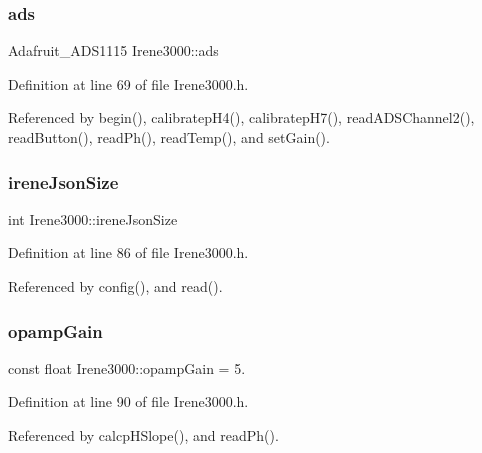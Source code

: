 \subsubsection{\texorpdfstring{ads}{ads}}
{\footnotesize\ttfamily Adafruit\+\_\+\+A\+D\+S1115 Irene3000\+::ads\hspace{0.3cm}{\ttfamily [private]}}



Definition at line 69 of file Irene3000.\+h.



Referenced by begin(), calibratep\+H4(), calibratep\+H7(), read\+A\+D\+S\+Channel2(), read\+Button(), read\+Ph(), read\+Temp(), and set\+Gain().

\mbox{\label{classIrene3000_a6534710e4c81669dcc828d2c5450fabe}} 
\subsubsection{\texorpdfstring{irene\+Json\+Size}{ireneJsonSize}}
{\footnotesize\ttfamily int Irene3000\+::irene\+Json\+Size\hspace{0.3cm}{\ttfamily [private]}}



Definition at line 86 of file Irene3000.\+h.



Referenced by config(), and read().

\mbox{\label{classIrene3000_a4e588985ca74e5076029d5dee81034f2}} 
\subsubsection{\texorpdfstring{opamp\+Gain}{opampGain}}
{\footnotesize\ttfamily const float Irene3000\+::opamp\+Gain = 5.\hspace{0.3cm}{\ttfamily [private]}}



Definition at line 90 of file Irene3000.\+h.



Referenced by calcp\+H\+Slope(), and read\+Ph().

\mbox{\label{classIrene3000_a136585a5ee7f9ac6ab52175fa153f8e3}} 
